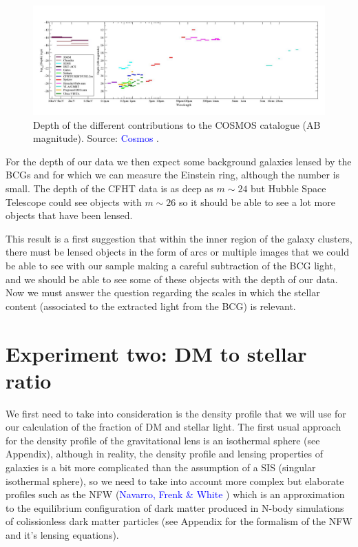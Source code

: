 \begin{figure}[H]
\centering
\includegraphics[width=15cm]{images/cosmos_depth-updated.jpg}
\caption[Depth of the different contributions to the COSMOS catalogue]{Depth of the different contributions to the COSMOS catalogue (AB magnitude). Source: \textcolor{blue}{Cosmos} \citeyear{Reference35}.}
\end{figure}

For the depth of our data we then expect some background galaxies lensed by the BCGs and for which we can measure the Einstein ring, although the number is small. The depth of the CFHT data is as deep as $m\sim 24$ but Hubble Space Telescope could see objects with $m\sim 26$ so it should be able to see a lot more objects that have been lensed. 

This result is a first suggestion that within the inner region of the galaxy clusters, there must be lensed objects in the form of arcs or multiple images that we could be able to see with our sample making a careful subtraction of the BCG light, and we should be able to see some of these objects with the depth of our data. Now we must answer the question regarding the scales in which the stellar content (associated to the extracted light from the BCG) is relevant.

\section{Experiment two: DM to stellar ratio}

We first need to take into consideration is the density profile that we will use for our calculation of the fraction of DM and stellar light. The first usual approach for the density profile of the gravitational lens is an isothermal sphere (see Appendix), although in reality, the density profile and lensing properties of galaxies is a bit more complicated than the assumption of a SIS (singular isothermal sphere), so we need to take into account more complex but elaborate profiles such as the NFW (\textcolor{blue}{Navarro, Frenk \& White} \citeyear{Reference17}) which is an approximation to the equilibrium configuration of dark matter produced in N-body simulations of colissionless dark matter particles (see Appendix for the formalism of the NFW and it's lensing equations).

